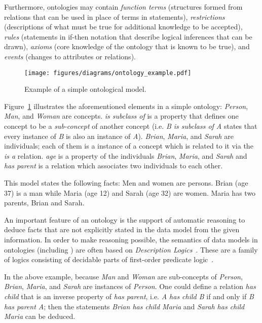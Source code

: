 Furthermore, ontologies may contain \emph{function terms} (structures formed from relations that can be used in place of terms in statements), \emph{restrictions} (descriptions of what must be true for additional knowledge to be accepted), \emph{rules} (statements in if-then notation that describe logical inferences that can be drawn), \emph{axioms} (core knowledge of the ontology that is known to be true), and \emph{events} (changes to attributes or relations).

\vspace{1em}

\begin{figure}
\centering
\texttt{[image: figures/diagrams/ontology\_example.pdf]}
\caption{Example of a simple ontological model.}
\label{fig:ontology_example}
\end{figure}

Figure~\ref{fig:ontology_example} illustrates the aforementioned elements in a simple ontology: \emph{Person}, \emph{Man}, and \emph{Woman} are concepts. \emph{is subclass of} is a property that defines one concept to be a \emph{sub-concept} of another concept (i.e. \emph{B is subclass of A} states that every instance of \emph{B} is also an instance of \emph{A}). \emph{Brian}, \emph{Maria}, and \emph{Sarah} are individuals; each of them is a instance of a concept which is related to it via the \emph{is a} relation. \emph{age} is a property of the individuals \emph{Brian}, \emph{Maria}, and \emph{Sarah} and \emph{has parent} is a relation which associates two individuals to each other.

This model states the following facts: Men and women are persons. Brian (age 37) is a man while Maria (age 12) and Sarah (age 32) are women. Maria has two parents, Brian and Sarah.

\vspace{1em}

An important feature of an ontology is the support of automatic reasoning to deduce facts that are not explicitly stated in the data model from the given information. In order to make reasoning possible, the semantics of data models in ontologies (including ) are often based on \emph{Description Logics}~\cite{OWL,SROIQ}. These are a family of logics consisting of decidable parts of first-order predicate logic~\cite{FirstOrderLogic}.

In the above example, because \emph{Man} and \emph{Woman} are sub-concepts of \emph{Person}, \emph{Brian}, \emph{Maria}, and \emph{Sarah} are instances of \emph{Person}. One could define a relation \emph{has child} that is an inverse property of \emph{has parent}, i.e. \emph{A has child B} if and only if \emph{B has parent A}; then the statements \emph{Brian has child Maria} and \emph{Sarah has child Maria} can be deduced.


